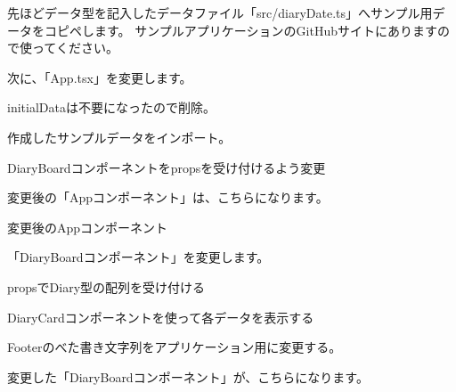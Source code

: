 \vspace*{\baselineskip}

先ほどデータ型を記入したデータファイル「src/diaryDate.ts」へサンプル用データをコピペします。
サンプルアプリケーションのGitHubサイトにありますので使ってください。

次に、「App.tsx」を変更します。

\begin{starterenumerate}
\item initialDataは不要になったので削除。
\item 作成したサンプルデータをインポート。
\item DiaryBoardコンポーネントをpropsを受け付けるよう変更
\end{starterenumerate}

変更後の「Appコンポーネント」は、こちらになります。

\def\startercodeblockfontsize{}
\begin{starterprogram}[]{変更後のAppコンポーネント}\end{starterprogram}

「DiaryBoardコンポーネント」を変更します。

\begin{starterenumerate}
\item propsでDiary型の配列を受け付ける
\item DiaryCardコンポーネントを使って各データを表示する
\item Footerのべた書き文字列をアプリケーション用に変更する。
\end{starterenumerate}

変更した「DiaryBoardコンポーネント」が、こちらになります。

